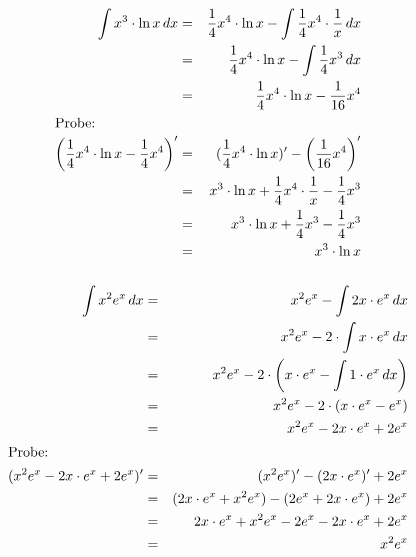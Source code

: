 \documentclass[10pt,a4paper,oneside,ngerman,numbers=noenddot]{scrartcl}
\begin{document}
\subsubsection{} %
\begin{alignat*}{2}
\int x^{3} \cdot \ln x \,dx &=& \frac{1}{4}x^{4} \cdot \ln x - \int \frac{1}{4}x^{4} \cdot \frac{1}{x}\,dx \\
&=& \frac{1}{4}x^{4} \cdot \ln x - \int \frac{1}{4}x^{3}\,dx \\
&=& \frac{1}{4}x^{4} \cdot \ln x - \frac{1}{16}x^{4} \\
\intertext{Probe:}
\left(\frac{1}{4}x^{4} \cdot \ln x - \frac{1}{4}x^{4}\right)' &=& (\frac{1}{4}x^{4} \cdot \ln x)' - \left(\frac{1}{16}x^{4}\right)' \\
&=& x^{3} \cdot \ln x + \frac{1}{4}x^{4} \cdot \frac{1}{x} - \frac{1}{4}x^{3} \\
&=& x^{3} \cdot \ln x + \frac{1}{4}x^{3} - \frac{1}{4}x^{3}\\
&=& x^{3} \cdot \ln x
\end{alignat*}
\subsubsection{} %
\begin{alignat*}{2}
\int x^{2}e^{x} \,dx &=& x^{2}e^{x} - \int 2x \cdot e^{x}\,dx \\
&=& x^{2}e^{x} - 2 \cdot \int x \cdot e^{x}\,dx \\
&=& x^{2}e^{x} - 2 \cdot \left(x \cdot e^{x} - \int 1 \cdot e^{x}\,dx \right) \\
&=& x^{2}e^{x} - 2 \cdot (x \cdot e^{x} - e^{x}) \\
&=& x^{2}e^{x} - 2x \cdot e^{x} +2e^{x} \\
\intertext{Probe:}
(x^{2}e^{x} - 2x \cdot e^{x} +2e^{x})' &=& (x^{2}e^{x})' - (2x \cdot e^{x})' + 2e^{x} \\
&=& (2x \cdot e^{x} + x^{2}e^{x}) - (2e^{x} + 2x \cdot e^{x}) + 2e^{x} \\
&=& 2x \cdot e^{x} + x^{2}e^{x} - 2e^{x} - 2x \cdot e^{x} + 2e^{x} \\
&=& x^{2}e^{x}
\end{alignat*}
\section{} %
\setcounter{subsubsection}{0}
\end{document}
